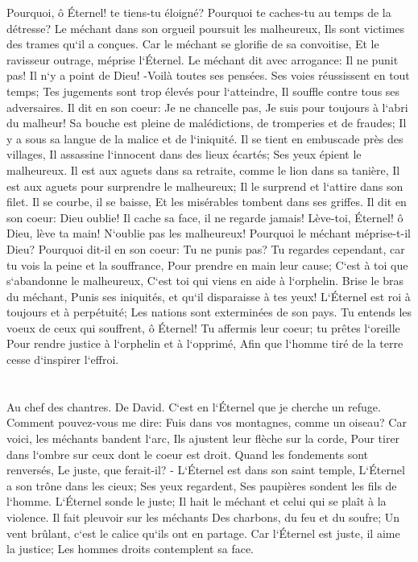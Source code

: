 \verse Pourquoi, ô Éternel! te tiens-tu éloigné? Pourquoi te caches-tu au temps de la détresse? 
\verse Le méchant dans son orgueil poursuit les malheureux, Ils sont victimes des trames qu`il a conçues. 
\verse Car le méchant se glorifie de sa convoitise, Et le ravisseur outrage, méprise l`Éternel. 
\verse Le méchant dit avec arrogance: Il ne punit pas! Il n`y a point de Dieu! -Voilà toutes ses pensées. 
\verse Ses voies réussissent en tout temps; Tes jugements sont trop élevés pour l`atteindre, Il souffle contre tous ses adversaires. 
\verse Il dit en son coeur: Je ne chancelle pas, Je suis pour toujours à l`abri du malheur! 
\verse Sa bouche est pleine de malédictions, de tromperies et de fraudes; Il y a sous sa langue de la malice et de l`iniquité. 
\verse Il se tient en embuscade près des villages, Il assassine l`innocent dans des lieux écartés; Ses yeux épient le malheureux. 
\verse Il est aux aguets dans sa retraite, comme le lion dans sa tanière, Il est aux aguets pour surprendre le malheureux; Il le surprend et l`attire dans son filet. 
\verse Il se courbe, il se baisse, Et les misérables tombent dans ses griffes. 
\verse Il dit en son coeur: Dieu oublie! Il cache sa face, il ne regarde jamais! 
\verse Lève-toi, Éternel! ô Dieu, lève ta main! N`oublie pas les malheureux! 
\verse Pourquoi le méchant méprise-t-il Dieu? Pourquoi dit-il en son coeur: Tu ne punis pas? 
\verse Tu regardes cependant, car tu vois la peine et la souffrance, Pour prendre en main leur cause; C`est à toi que s`abandonne le malheureux, C`est toi qui viens en aide à l`orphelin. 
\verse Brise le bras du méchant, Punis ses iniquités, et qu`il disparaisse à tes yeux! 
\verse L`Éternel est roi à toujours et à perpétuité; Les nations sont exterminées de son pays. 
\verse Tu entends les voeux de ceux qui souffrent, ô Éternel! Tu affermis leur coeur; tu prêtes l`oreille 
\verse Pour rendre justice à l`orphelin et à l`opprimé, Afin que l`homme tiré de la terre cesse d`inspirer l`effroi. 

\chapter{}

\verse Au chef des chantres. De David. C`est en l`Éternel que je cherche un refuge. Comment pouvez-vous me dire: Fuis dans vos montagnes, comme un oiseau? 
\verse Car voici, les méchants bandent l`arc, Ils ajustent leur flèche sur la corde, Pour tirer dans l`ombre sur ceux dont le coeur est droit. 
\verse Quand les fondements sont renversés, Le juste, que ferait-il? - 
\verse L`Éternel est dans son saint temple, L`Éternel a son trône dans les cieux; Ses yeux regardent, Ses paupières sondent les fils de l`homme. 
\verse L`Éternel sonde le juste; Il hait le méchant et celui qui se plaît à la violence. 
\verse Il fait pleuvoir sur les méchants Des charbons, du feu et du soufre; Un vent brûlant, c`est le calice qu`ils ont en partage. 
\verse Car l`Éternel est juste, il aime la justice; Les hommes droits contemplent sa face. 

